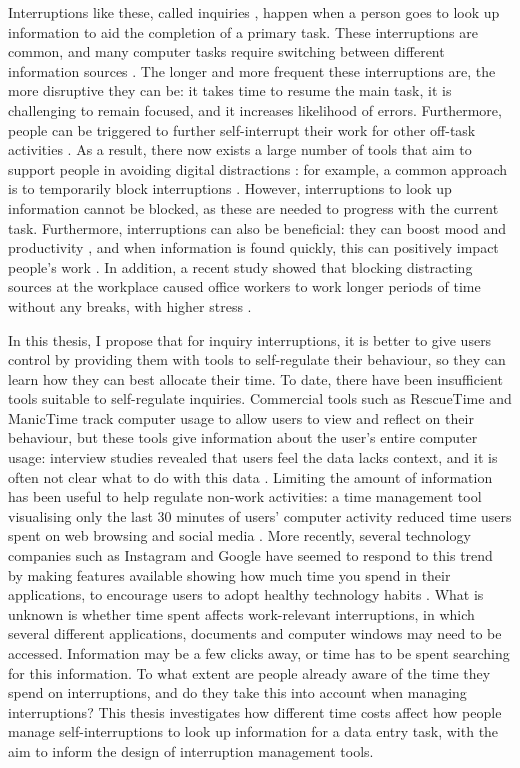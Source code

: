 Interruptions like these, called inquiries \citep{Jin2009}, happen when a person goes to look up information to aid the completion of a primary task. These interruptions are common, and many computer tasks require switching between  different information sources \citep{Cangiano2009}. The longer and more frequent these interruptions are, the more disruptive they can be: it takes time to resume the main task, it is challenging to remain focused, and it increases likelihood of errors. Furthermore, people can be triggered to further self-interrupt their work for other off-task activities \citep{Jin2009}. As a result, there now exists a large number of tools that aim to support people in avoiding digital distractions \citep{Lyngs2018}: for example, a common approach is to temporarily block interruptions \citep{Kim2017}. However, interruptions to look up information cannot be blocked, as these are needed to progress with the current task. Furthermore, interruptions can also be beneficial: they can boost mood and productivity \citep{Mark2014a}, and when information is found quickly, this can positively impact people’s work \citep{Jin2009}. In addition, a recent study showed that blocking distracting sources at the workplace caused office workers to work longer periods of time without any breaks, with higher stress \citep{Mark2018}.

In this thesis, I propose that for inquiry interruptions, it is better to give users control by providing them with tools to self-regulate their behaviour, so they can learn how they can best allocate their time. To date, there have been insufficient tools suitable to self-regulate inquiries. Commercial tools such as RescueTime and ManicTime track computer usage to allow users to view and reflect on their behaviour, but these tools give information about the user’s entire computer usage: interview studies revealed that users feel the data lacks context, and it is often not clear what to do with this data \citep{Collins2014}. Limiting the amount of information has been useful to help regulate non-work activities: a time management tool visualising only the last 30 minutes of users' computer activity reduced time users spent on web browsing and social media \citep{Whittaker2016}. More recently, several technology companies such as Instagram and Google have seemed to respond to this trend by making features available showing how much time you spend in their applications, to encourage users to adopt healthy technology habits \citep{Constine2018, Lynley2018}. What is unknown is whether time spent affects work-relevant interruptions, in which several different applications, documents and computer windows may need to be accessed. Information may be a few clicks away, or time has to be spent searching for this information. To what extent are people already aware of the time they spend on interruptions, and do they take this into account when managing interruptions? This thesis investigates how different time costs affect how people manage self-interruptions to look up information for a data entry task, with the aim to inform the design of interruption management tools.

